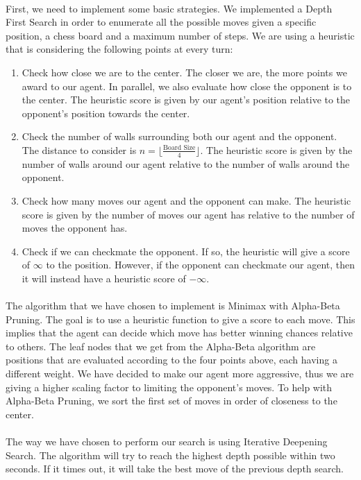 \documentclass[12pt,a4paper]{article}
\begin{document}
\paragraph{} First, we need to implement some basic strategies. We implemented a Depth First Search in order to enumerate 
all the possible moves given a specific position, a chess board and a maximum number of steps. We are using a heuristic 
that is considering the following points at every turn:
\begin{enumerate}
    \item Check how close we are to the center. The closer we are, the more points we award to our agent. 
    In parallel, we also evaluate how close the opponent is to the center. The heuristic score is given by 
    our agent's position relative to the opponent's position towards the center. 
    \item  Check the number of walls surrounding both our agent and the opponent. The distance to consider 
    is $n = \lfloor\frac{\text{Board Size}}{4}\rfloor$. The heuristic score is given by 
    the number of walls around our agent relative to the number of 
    walls around the opponent. 
    \item Check how many moves our agent and the opponent can make. The heuristic score is given by the 
    number of moves our agent has relative to the number of moves the opponent has. 
    \item Check if we can checkmate the opponent. If so, the heuristic will give a score of $\infty$ to the position. 
    However, if the opponent can checkmate our agent, then it will instead have a heuristic score of $-\infty$. 
\end{enumerate}
\paragraph{} The algorithm that we have chosen to implement is Minimax with Alpha-Beta Pruning. 
The goal is to use a heuristic function to give a score to each move. This implies that the agent can 
decide which move has better winning chances relative to others. The leaf nodes that we get from the Alpha-Beta 
algorithm are positions that are evaluated according to the four points above, each having a different weight.
We have decided to make our agent more aggressive, thus we are giving a higher scaling factor to limiting the 
opponent's moves. To help with Alpha-Beta Pruning, we sort the first set of moves in order of closeness to the center.
\paragraph{} The way we have chosen to perform our search is using Iterative Deepening Search. The algorithm will try to reach the 
highest depth possible within two seconds. If it times out, it will take the best move of the previous depth search. 
\end{document}
